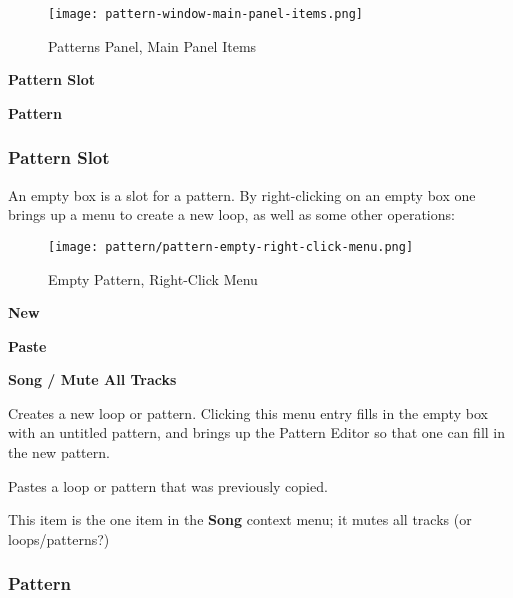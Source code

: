 \begin{figure}[H]
   \centering 
   \texttt{[image: pattern-window-main-panel-items.png]}
   \caption{Patterns Panel, Main Panel Items}
   \label{fig:pattern_window_main_panel_items}
\end{figure}

   \begin{enumber}
      \item \textbf{Pattern Slot}
      \item \textbf{Pattern}
   \end{enumber}

\subsubsection{Pattern Slot}
\label{subsubsec:seq24_patterns_pattern_slot}

   An empty box is a slot for a pattern.
   By right-clicking on an empty box one brings up a menu to create
   a new loop, as well as some other operations:

\begin{figure}[H]
   \centering 
   \texttt{[image: pattern/pattern-empty-right-click-menu.png]}
   \caption{Empty Pattern, Right-Click Menu}
   \label{fig:pattern_window_empty_right_click}
\end{figure}

   \begin{enumber}
      \item \textbf{New}
      \item \textbf{Paste}
      \item \textbf{Song / Mute All Tracks}
   \end{enumber}

   \setcounter{ItemCounter}{0}      %

   Creates a new loop or pattern.
   Clicking this menu entry fills in the empty box with an untitled
   pattern, and brings up the Pattern Editor
   so that one can fill in the new pattern.

   Pastes a loop or pattern that was previously copied.

   This item is the one item in the \textbf{Song} context menu;
   it mutes all tracks (or loops/patterns?)

\subsubsection{Pattern}
\label{subsubsec:seq24_patterns_pattern_filled}

